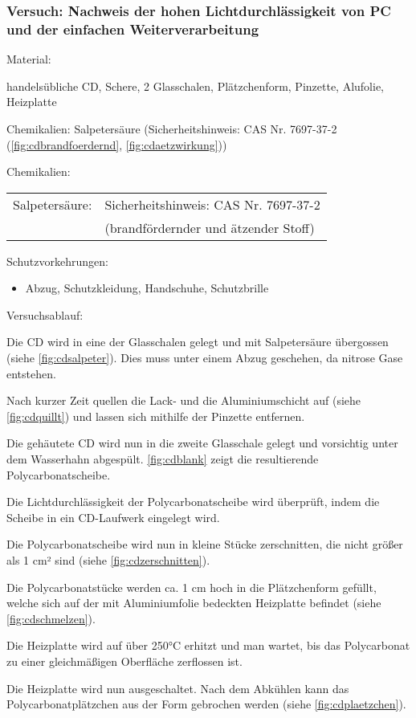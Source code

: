 \subsubsection{Versuch: Nachweis der hohen Lichtdurchlässigkeit von PC und der einfachen Weiterverarbeitung}

Material:
\begin{itemize*}
    \item handelsübliche CD, Schere, 2 Glasschalen, Plätzchenform, Pinzette, Alufolie, Heizplatte
    \item Chemikalien: Salpetersäure (Sicherheitshinweis: CAS Nr. 7697-37-2 (\autoref{fig:cdbrandfoerdernd}, \autoref{fig:cdaetzwirkung}))
    \item Chemikalien: \\
    \begin{xtabular}{ll}
    Salpetersäure: & Sicherheitshinweis: CAS Nr. 7697-37-2 \\
    & (brandfördernder und ätzender Stoff) \\
    \end{xtabular}
\end{itemize*}

Schutzvorkehrungen:
\begin{itemize}
    \item Abzug, Schutzkleidung, Handschuhe, Schutzbrille
\end{itemize}

Versuchsablauf:
\begin{enumerate*}
    \item Die CD wird in eine der Glasschalen gelegt und mit Salpetersäure übergossen (siehe \autoref{fig:cdsalpeter}). Dies muss unter einem Abzug geschehen, da nitrose Gase entstehen.
    \item Nach kurzer Zeit \glqq quellen\grqq{} die Lack- und die Aluminiumschicht auf (siehe \autoref{fig:cdquillt}) und lassen sich mithilfe der Pinzette entfernen.
    \item Die \glqq gehäutete\grqq{} CD wird nun in die zweite Glasschale gelegt und vorsichtig unter dem Wasserhahn abgespült. \autoref{fig:cdblank} zeigt die resultierende Polycarbonatscheibe.
    \item Die Lichtdurchlässigkeit der Polycarbonatscheibe wird überprüft, indem die Scheibe in ein CD-Laufwerk eingelegt wird.
    \item Die Polycarbonatscheibe wird nun in kleine Stücke zerschnitten, die nicht größer als 1 cm² sind (siehe \autoref{fig:cdzerschnitten}).
    \item Die Polycarbonatstücke werden ca. 1 cm hoch in die Plätzchenform gefüllt, welche sich auf der mit Aluminiumfolie bedeckten Heizplatte befindet (siehe \autoref{fig:cdschmelzen}).
    \item Die Heizplatte wird auf über 250°C erhitzt und man wartet, bis das Polycarbonat zu einer gleichmäßigen Oberfläche zerflossen ist.
    \item Die Heizplatte wird nun ausgeschaltet. Nach dem Abkühlen kann das \glqq Polycarbonatplätzchen\grqq{} aus der Form gebrochen werden (siehe \autoref{fig:cdplaetzchen}).
\end{enumerate*}

